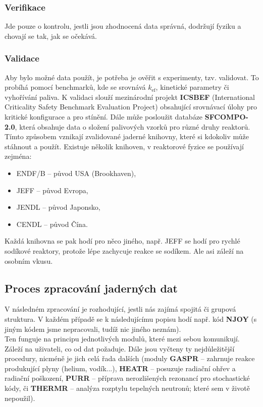 \subsubsection{Verifikace}

Jde pouze o kontrolu, jestli jsou zhodnocená data správná, dodržují fyziku a chovají se tak, jak se očekává.

\subsubsection{Validace}

Aby bylo možné data použít, je potřeba je ověřit s experimenty, tzv. validovat. To probíhá pomocí benchmarků, kde se srovnává $k_\text{ef}$, kinetické parametry či vyhořívání paliva. K validaci slouží mezinárodní projekt \textbf{ICSBEF} (International Criticality Safety Benchmark Evaluation Project) obsahující srovnávací úlohy pro kritické konfigurace a pro stínění. Dále může posloužit databáze \textbf{SFCOMPO-2.0}, která obsahuje data o složení palivových vzorků pro různé druhy reaktorů.\\

Tímto způsobem vznikají zvalidované jaderné knihovny, které si kdokoliv může stáhnout a použít. Existuje několik knihoven, v reaktorové fyzice se používají zejména:

\begin{itemize}
  \item ENDF/B -- původ USA (Brookhaven),
  \item JEFF -- původ Evropa,
  \item JENDL -- původ Japonsko,
  \item CENDL -- původ Čína.
\end{itemize}

Každá knihovna se pak hodí pro něco jiného, např. JEFF se hodí pro rychlé sodíkové reaktory, protože lépe zachycuje reakce se sodíkem. Ale asi záleží na osobním vkusu.

\subsection{Proces zpracování jaderných dat}

V následném zpracování je rozhodující, jestli nás zajímá spojitá či grupová struktura. V každém případě se k následujícímu popisu hodí např. kód \textbf{NJOY} (s jiným kódem jsme nepracovali, tudíž nic jiného neznám).\\

Ten funguje na principu jednotlivých modulů, které mezi sebou komunikují. Záleží na uživateli, co od dat požaduje. Dále jsou vyčteny ty nejdůležitější procedury, nicméně je jich celá řada dalších (moduly \textbf{GASPR} -- zahrnuje reakce produkující plyny (helium, vodík...), \textbf{HEATR} -- posuzuje radiační ohřev a radiační poškození, \textbf{PURR} -- příprava nerozlišených rezonancí pro stochastické kódy, či \textbf{THERMR} -- analýza rozptylu tepelných neutronů; které sem v životě nepoužil).\\

